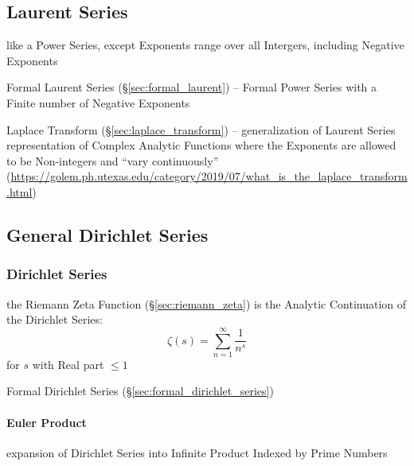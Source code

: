 \subsection{Laurent Series}\label{sec:laurent_series}

like a Power Series, except Exponents range over all Intergers, including
Negative Exponents

\fist Formal Laurent Series (\S\ref{sec:formal_laurent}) -- Formal Power Series
with a Finite number of Negative Exponents

\fist Laplace Transform (\S\ref{sec:laplace_transform}) -- generalization of
Laurent Series representation of Complex Analytic Functions where the Exponents
are allowed to be Non-integers and ``vary continuously''
(\url{https://golem.ph.utexas.edu/category/2019/07/what_is_the_laplace_transform.html})



\subsection{General Dirichlet Series}\label{sec:general_dirichlet}




\subsubsection{Dirichlet Series}\label{sec:dirichlet_series}

the Riemann Zeta Function (\S\ref{sec:riemann_zeta}) is the Analytic
Continuation of the Dirichlet Series:
\[
  \zeta(s) = \sum_{n=1}^\infty \frac{1}{n^s}
\]
for $s$ with Real part $\leq 1$

\fist Formal Dirichlet Series (\S\ref{sec:formal_dirichlet_series})



\paragraph{Euler Product}\label{sec:euler_product}\hfill

expansion of Dirichlet Series into Infinite Product Indexed by Prime Numbers



